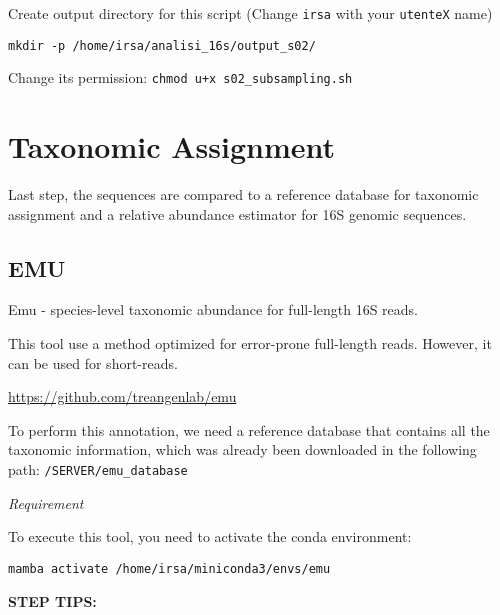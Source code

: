 \documentclass[
]{book}
\begin{document}
Create output directory for this script (Change \texttt{irsa} with your \texttt{utenteX} name)

\begin{verbatim}
mkdir -p /home/irsa/analisi_16s/output_s02/
\end{verbatim}

Change its permission:
\texttt{chmod\ u+x\ s02\_subsampling.sh}

\section{Taxonomic Assignment}\label{taxonomic-assignment}

Last step, the sequences are compared to a reference database for taxonomic assignment and a relative abundance estimator for 16S genomic sequences.

\subsection{EMU}\label{emu}

Emu - species-level taxonomic abundance for full-length 16S reads.

This tool use a method optimized for error-prone full-length reads. However, it can be used for short-reads.

\url{https://github.com/treangenlab/emu}

To perform this annotation, we need a reference database that contains all the taxonomic information, which was already been downloaded in the following path: \texttt{/SERVER/emu\_database}

\emph{Requirement}

To execute this tool, you need to activate the conda environment:

\texttt{mamba\ activate\ /home/irsa/miniconda3/envs/emu}

\textbf{STEP TIPS:}
\end{document}
